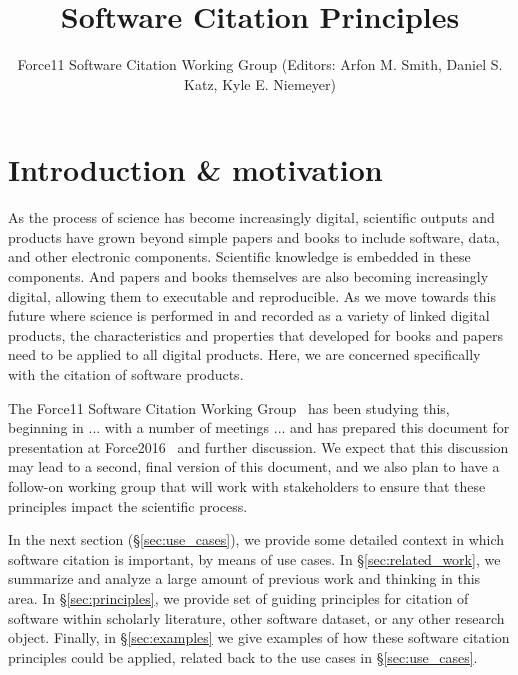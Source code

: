 \documentclass[11pt, oneside]{amsart}
\title{Software Citation Principles}
\author{Force11 Software Citation Working Group (Editors: Arfon M. Smith, Daniel S. Katz, Kyle E. Niemeyer)}
\date{}
\begin{document}
\begin{abstract}
\end{abstract}

\maketitle


\section{Introduction \& motivation}
\label{sec:intro}

As the process of science has become increasingly digital, scientific outputs and products have
grown beyond simple papers and books to include software, data, and other electronic
components.  Scientific knowledge is embedded in these components.  And papers and books
themselves are also becoming increasingly digital, allowing them to executable
and reproducible.  As we move towards this future where science is performed in and recorded
as a variety of linked digital products, the characteristics and properties that developed for
books and papers need to be applied to all digital products.  Here, we are concerned specifically
with the citation of software products.

The Force11 Software Citation Working Group~\cite{f11scwg} has been studying this,
beginning in ...  with a number of meetings ... and has prepared this document for
presentation at Force2016~\cite{force2016} and further discussion.  We expect that
this discussion may lead to a second, final version of this document, and we also
plan to have a follow-on working group that will work with stakeholders to ensure that
these principles impact the scientific process.

In the next section (\S\ref{sec:use_cases}), we provide some detailed context in which
software citation is important, by means of use cases.  In \S\ref{sec:related_work}, we
summarize and analyze a large amount of previous work and thinking in this area.  In
\S\ref{sec:principles}, we provide set of guiding principles for citation of software within
scholarly literature, other software dataset, or any other research object.  Finally,
in \S\ref{sec:examples} we give examples of how these software citation principles
could be applied, related back to the use cases in \S\ref{sec:use_cases}.
\end{document}
